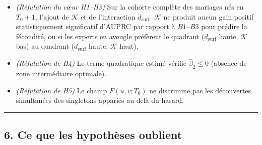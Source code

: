 \documentclass[a4paper,11pt]{article}
\providecommand{\tightlist}{\setlength{\itemsep}{0pt}\setlength{\parskip}{0pt}}
\begin{document}
\begin{enumerate}
  \begin{itemize}
  \tightlist
  \item
    \emph{(Réfutation du cœur H1--H3)} Sur la cohorte complète des
    mariages nés en \(T_0+1\), l'ajout de \(\mathcal{K}\) et de
    l'interaction \(d_{\text{surf}} \cdot \mathcal{K}\) ne produit aucun
    gain positif statistiquement significatif d'AUPRC par rapport à
    \(B1\text{--}B3\) pour prédire la fécondité, ou si les experts en
    aveugle préfèrent le quadrant (\(d_{\text{surf}}\) haute,
    \(\mathcal{K}\) bas) au quadrant (\(d_{\text{surf}}\) haute,
    \(\mathcal{K}\) haut).
  \item
    \emph{(Réfutation de H4)} Le terme quadratique estimé vérifie
    \(\hat{\beta}_2 \le 0\) (absence de zone intermédiaire optimale).
  \item
    \emph{(Réfutation de H5)} Le champ \(F(u,v; T_0)\) ne discrimine pas
    les découvertes simultanées des singletons appariés au-delà du
    hasard.
  \end{itemize}
\end{enumerate}

\begin{center}\rule{0.5\linewidth}{0.5pt}\end{center}

\subsection*{6. Ce que les hypothèses oublient}
\end{document}
